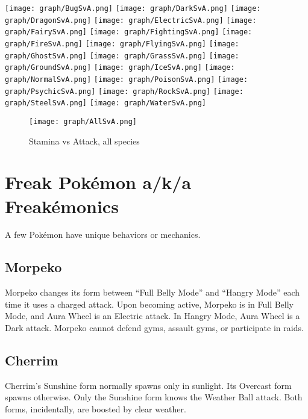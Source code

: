 \noindent{}\texttt{[image: graph/BugSvA.png]}
\texttt{[image: graph/DarkSvA.png]}
\texttt{[image: graph/DragonSvA.png]}
\texttt{[image: graph/ElectricSvA.png]}
\texttt{[image: graph/FairySvA.png]}
\texttt{[image: graph/FightingSvA.png]}
\texttt{[image: graph/FireSvA.png]}
\texttt{[image: graph/FlyingSvA.png]}
\texttt{[image: graph/GhostSvA.png]}
\texttt{[image: graph/GrassSvA.png]}
\texttt{[image: graph/GroundSvA.png]}
\texttt{[image: graph/IceSvA.png]}
\texttt{[image: graph/NormalSvA.png]}
\texttt{[image: graph/PoisonSvA.png]}
\texttt{[image: graph/PsychicSvA.png]}
\texttt{[image: graph/RockSvA.png]}
\texttt{[image: graph/SteelSvA.png]}
\texttt{[image: graph/WaterSvA.png]}

\begin{figure}[hb]
\centering
\texttt{[image: graph/AllSvA.png]}
  \caption{Stamina vs Attack, all species\label{figure:allsva}}
\end{figure}

\section{Freak Pokémon a/k/a Freakémonics\label{sec:freaks}}
A few Pokémon have unique behaviors or mechanics.

\subsection{Morpeko\label{subsec:morpeko}}
Morpeko changes its form between ``Full Belly Mode'' and ``Hangry Mode''
  each time it uses a charged attack.
Upon becoming active, Morpeko is in Full Belly Mode, and Aura Wheel is an Electric attack.
In Hangry Mode, Aura Wheel is a Dark attack.
Morpeko cannot defend gyms, assault gyms, or participate in raids.

\subsection{Cherrim}
Cherrim's Sunshine form normally spawns only in sunlight.
Its Overcast form spawns otherwise.
Only the Sunshine form knows the Weather Ball attack.
Both forms, incidentally, are boosted by clear weather.

